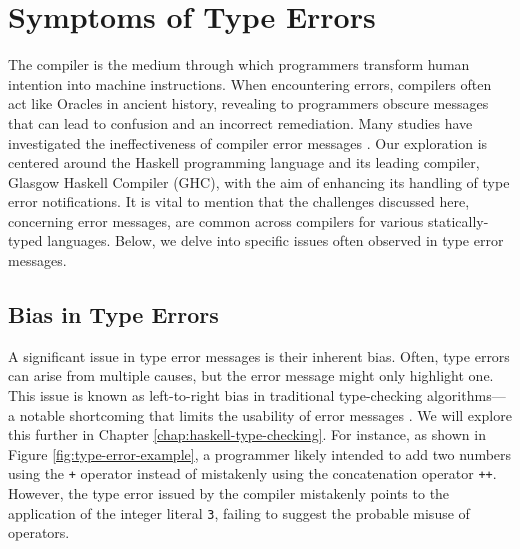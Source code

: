 \section{Symptoms of Type Errors}
\label{sec:symptoms}
 The compiler is the medium through which programmers transform human intention into machine instructions. When encountering errors, compilers often act like Oracles in ancient history, revealing to programmers obscure messages that can lead to confusion and an incorrect remediation. Many studies have investigated the ineffectiveness of compiler error messages \cite{Barik2017-gy, Becker2019-cs, Becker2016-kc}.  Our exploration is centered around the Haskell programming language and its leading compiler, Glasgow Haskell Compiler (GHC), with the aim of enhancing its handling of type error notifications. It is vital to mention that the challenges discussed here, concerning error messages, are common across compilers for various statically-typed languages. Below, we delve into specific issues often observed in type error messages.


 \subsection{Bias in Type Errors} 
 \label{subsec:bias}
 
A significant issue in type error messages is their inherent bias. Often, type errors can arise from multiple causes, but the error message might only highlight one. This issue is known as left-to-right bias in traditional type-checking algorithms—a notable shortcoming that limits the usability of error messages \cite{McAdam2002-vb, Lee1998-fx, Chen2014-ev}. We will explore this further in Chapter \ref{chap:haskell-type-checking}. For instance, as shown in Figure \ref{fig:type-error-example}, a programmer likely intended to add two numbers using the \texttt{+} operator instead of mistakenly using the concatenation operator \texttt{++}. However, the type error issued by the compiler mistakenly points to the application of the integer literal \texttt{3}, failing to suggest the probable misuse of operators.

